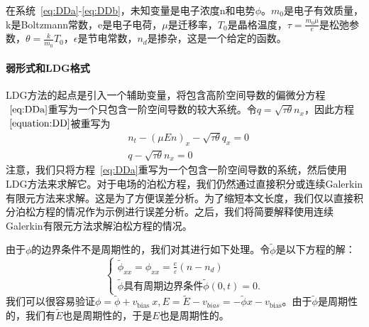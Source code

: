 在系统~\eqref{eq:DDa}-\eqref{eq:DDb}，未知变量是电子浓度n和电势$\phi$。$m_0$是电子有效质量，k是Boltzmann常数，e是电子电荷，$\mu$是迁移率，$T_0$是晶格温度，$\tau = \frac{m_0 \mu}{e}$是松弛参数，$\theta = \frac{k}{m_0}T_0$，$\epsilon$是节电常数，$n_d$是掺杂，这是一个给定的函数。
\paragraph{弱形式和LDG格式}
LDG方法的起点是引入一个辅助变量，将包含高阶空间导数的偏微分方程$~\eqref{eq:DDa}$重写为一个只包含一阶空间导数的较大系统。令$q=\sqrt{\tau \theta} n_{x}$，因此方程$~\eqref{equation:DD}$被重写为
\begin{align}
     & n_{t}-(\mu E n)_{x}-\sqrt{\tau \theta} q_{x}=0 \label{eq:DDaReforma} \\
     & q-\sqrt{\tau \theta} n_{x}=0 \label{eq:DDaReformb}
\end{align}
注意，我们只将方程~\eqref{eq:DDa}重写为一个包含一阶空间导数的系统，然后使用LDG方法来求解它。对于电场的泊松方程，我们仍然通过直接积分或连续Galerkin有限元方法来求解。这是为了方便误差分析。为了缩短本文长度，我们仅以直接积分泊松方程的情况作为示例进行误差分析。之后，我们将简要解释使用连续Galerkin有限元方法求解泊松方程的情况。

由于$\phi$的边界条件不是周期性的，我们对其进行如下处理。令$\tilde{\phi}$是以下方程的解：
\begin{equation*}
    \left\{\begin{array}{l}
        \tilde{\phi}_{x x}=\phi_{x x}=\frac{e}{\varepsilon}\left(n-n_{d}\right) \\
        \tilde{\phi} \text {具有周期边界条件} \tilde{\phi}(0, t)=0 .
    \end{array}\right.
\end{equation*}
我们可以很容易验证$\phi=\tilde{\phi}+v_{\text {bias }} x, E=\tilde{E}-v_{bias}=-\tilde{\phi}{x}-v_{\text {bias}}$。由于$\tilde{\phi}$是周期性的，我们有$\tilde{E}$也是周期性的，于是$E$也是周期性的。

